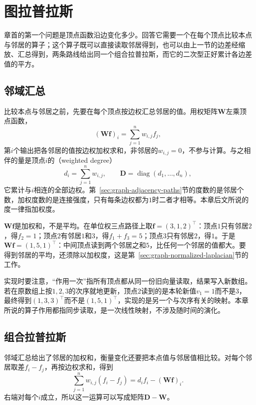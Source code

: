 
\section{图拉普拉斯}
\label{sec:graph-laplacian}

章首的第一个问题是顶点函数沿边变化多少。回答它需要一个在每个顶点比较本点与邻居的算子；这个算子既可以直接读取邻居得到，也可以由上一节的边差经缩放、汇总得到，两条路线给出同一个组合拉普拉斯，而它的二次型正好累计各边差值的平方。

\subsection{邻域汇总}
\label{sec:graph-spec-neighborhood-aggregation}

比较本点与邻居之前，先要在每个顶点按边权汇总邻居的值。用权矩阵$\bm W$左乘顶点函数，
\[
 (\bm W\bm f)_i=\sum_{j=1}^nw_{i,j}f_j ,
\]
第$i$个输出把各邻居的值按边权加权求和，非邻居的$w_{i,j}=0$，不参与计算。与之相伴的量是顶点$i$的（weighted degree）
\[
 d_i=\sum_{j=1}^nw_{i,j},\qquad \bm D=\operatorname{diag}(d_1,\ldots,d_n),
\]
它累计与$i$相连的全部边权。第~\ref{sec:graph-adjacency-paths}节的度数的是邻居个数，加权度数的是连接强度，只有每条边权都为$1$时二者才相等。本章后文所说的度一律指加权度。

$\bm W\bm f$是加权和，不是平均。在单位权三点路径上取$\bm f=(3,1,2)^{\top}$：顶点$1$只有邻居$2$，得$f_2=1$；顶点$2$有邻居$1$和$3$，得$f_1+f_3=5$；顶点$3$只有邻居$2$，得$1$。于是$\bm W\bm f=(1,5,1)^{\top}$：中间顶点读到两个邻居之和$5$，比任何一个邻居的值都大。要得到邻居的平均，还须除以加权度，这是第~\ref{sec:graph-normalized-laplacian}节的工作。

实现时要注意，“作用一次”指所有顶点都从同一份旧向量读取，结果写入新数组。若在原数组上按$1,2,3$的次序就地更新，顶点$2$读到的是本轮新值$v_1=1$而不是$3$，最终得到$(1,3,3)^{\top}$而不是$(1,5,1)^{\top}$，实现的是另一个与次序有关的映射。本章所说的算子作用都指同步读取，是一次线性映射，不涉及随时间的演化。

\subsection{组合拉普拉斯}
\label{sec:graph-spec-combinatorial-laplacian}

邻域汇总给出了邻居的加权和，衡量变化还要把本点值与邻居值相比较。对每个邻居取差$f_i-f_j$，再按边权求和，得到
\[
 \sum_{j=1}^nw_{i,j}(f_i-f_j)=d_if_i-(\bm W\bm f)_i .
\]
右端对每个$i$成立，所以这一运算可以写成矩阵$\bm D-\bm W$。

